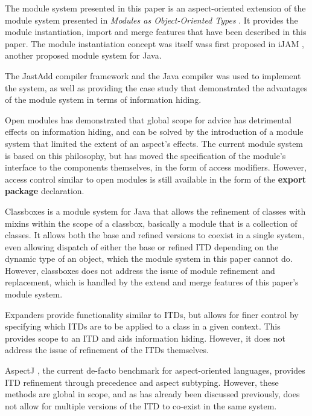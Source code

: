 The module system presented in this paper is an aspect-oriented extension of the module
system presented in \textit{Modules as Object-Oriented Types} \cite{modulesastypes}. It
provides the module instantiation, import and merge features that have been described in
this paper. The module instantiation concept was itself wass first proposed in iJAM \cite{iJAM}, 
another proposed module system for Java.

The JastAdd compiler framework and the Java compiler \cite{jastadd, jastaddjavacompiler}
was used to implement the system, as well as providing the case study that demonstrated 
the advantages of the module system in terms of information hiding.

Open modules \cite{openmodules, openmodulesaj} has demonstrated that global scope for advice
has detrimental effects on information hiding, and can be solved by
the introduction of a module system that limited the extent of an aspect's effects. The
current module system is based on this philosophy, but has moved the specification of
the module's interface to the components themselves, in the form of access modifiers.
However, access control similar to open modules is still available in the form of the
\textbf{export package} declaration.

Classboxes \cite{classboxj} is a module system for Java that allows the refinement of classes
with mixins within the scope of a classbox, basically a module that is a collection of classes. 
It allows both the base and refined versions to coexist in a single system, even allowing
dispatch of either the base or refined ITD depending on the dynamic type of an object, which
the module system in this paper cannot do. However, classboxes does not address the issue of
module refinement and replacement, which is handled by the extend and merge features of
this paper's module system.

Expanders \cite{expanders} provide functionality similar to ITDs, but allows for finer control
by specifying which ITDs are to be applied to a class in a given context. This provides scope
to an ITD and aids information hiding. However, it does not address the issue of refinement of 
the ITDs themselves.

AspectJ \cite{overviewaspectj}, the current de-facto benchmark for aspect-oriented languages, 
provides ITD refinement through precedence and aspect subtyping. However, these methods are
global in scope, and as has already been discussed previously, does not allow for multiple
versions of the ITD to co-exist in the same system.

